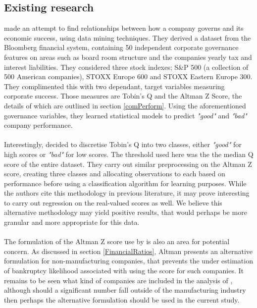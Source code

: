 \subsection{Existing research}
{\cite{moldovan2015learning} made an attempt to find relationships between how a company governs and its economic success, using data mining techniques. They derived a dataset from the Bloomberg financial system, containing 50 independent corporate governance features on areas such as board room structure and the  companies yearly tax and interest liabilities. They considered three stock indexes; S\&P 500 (a collection of 500 American companies), STOXX Europe 600 and STOXX Eastern Europe 300. They complimented this with two dependant, target variables measuring corporate success. Those measures are Tobin's Q and the Altman Z Score, the details of which are outlined in section \ref{comPerform}. Using the aforementioned governance variables, they learned statistical models to predict {\it "good"} and {\it "bad"} company performance.\\\\
Interestingly, \cite{moldovan2015learning} decided to discretise Tobin's Q into two classes, either {\it "good"} for high scores or {\it "bad"} for low scores. The threshold used here was the the median Q score of the entire dataset. They carry out similar preprocessing on the Altman Z score, creating three classes and allocating observations to each based on performance before using a classification algorithm for learning purposes. While the authors cite this methodology in previous literature, it may prove interesting to carry out regression on the real-valued scores as well. We believe this alternative methodology may yield positive results, that would perhaps be more granular and more appropriate for this data. \\\\
The formulation of the Altman Z score use by \cite{moldovan2015learning} is also an area for potential concern. As discussed in section \ref{FinancialRatios}, Altman presents an alternative formulation for non-manufacturing companies, that prevents the under estimation of bankruptcy likelihood associated with using the score for such companies. It remains to be seen what kind of companies are included in the analysis of \cite{moldovan2015learning}, although should a significant number fall outside of the manufacturing industry then perhaps the alternative formulation should be used in the current study.   \\\\
}
